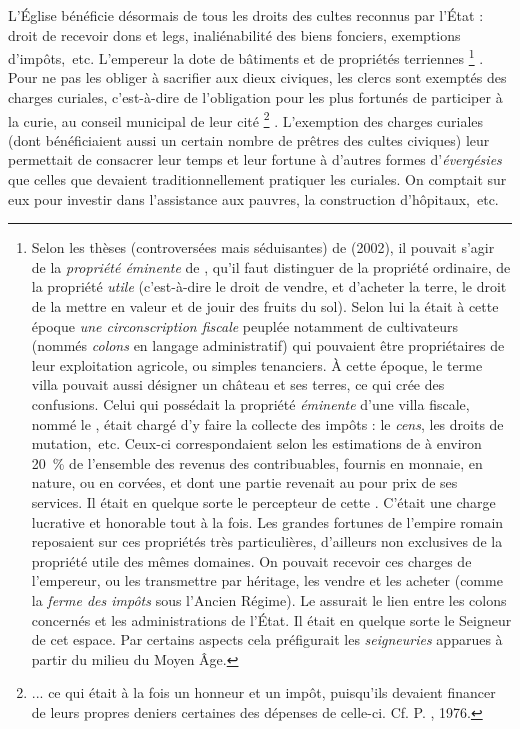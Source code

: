  L'Église bénéficie désormais de tous les droits des cultes reconnus par l'État : droit de recevoir dons et legs, inaliénabilité des biens fonciers, exemptions d'impôts,~etc. L'empereur la dote de bâtiments et de propriétés terriennes%
\footnote{Selon les thèses (controversées mais séduisantes) de  (2002), il pouvait s'agir de la \emph{propriété éminente} de , qu'il faut distinguer de la propriété ordinaire, de la propriété \emph{utile} (c'est-à-dire le droit de vendre, et d'acheter la terre, le droit de la mettre en valeur et de jouir des fruits du sol). Selon lui la  était à cette époque \emph{une circonscription fiscale} peuplée notamment de cultivateurs (nommés \emph{colons} en langage administratif) qui pouvaient être propriétaires de leur exploitation agricole, ou simples tenanciers. À cette époque, le terme villa pouvait aussi désigner un château et ses terres, ce qui crée des confusions. Celui qui possédait la propriété \emph{éminente} d'une villa fiscale, nommé le , était chargé d'y faire la collecte des impôts : le \emph{cens}, les droits de mutation,~etc. Ceux-ci correspondaient selon les estimations de  à environ 20~\% de l'ensemble des revenus des contribuables, fournis en monnaie, en nature, ou en corvées, et dont une partie revenait au  pour prix de ses services. Il était en quelque sorte le percepteur de cette . C'était une charge lucrative et honorable tout à la fois. Les grandes fortunes de l'empire romain reposaient sur ces propriétés très particulières, d'ailleurs non exclusives de la propriété utile des mêmes domaines. On pouvait recevoir ces charges de l'empereur, ou les transmettre par héritage, les vendre et les acheter (comme la \emph{ferme des impôts} sous l'Ancien Régime). Le  assurait le lien entre les colons concernés et les administrations de l'État. Il était en quelque sorte le Seigneur de cet espace. Par certains aspects cela préfigurait les \emph{seigneuries} apparues à partir du milieu du Moyen Âge.}%
. Pour ne pas les obliger à sacrifier aux dieux civiques, les clercs sont exemptés des charges curiales, c'est-à-dire de l'obligation pour les plus fortunés de participer à la curie, au conseil municipal de leur cité%
\footnote{... ce qui était à la fois un honneur et un impôt, puisqu'ils devaient financer de leurs propres deniers certaines des dépenses de celle-ci. Cf. P. , 1976.} 
. L'exemption des charges curiales (dont bénéficiaient aussi un certain nombre de prêtres des cultes civiques) leur permettait de consacrer leur temps et leur fortune à d'autres formes d'\emph{évergésies} que celles que devaient traditionnellement pratiquer les curiales. On comptait sur eux pour investir dans l'assistance aux pauvres, la construction d'hôpitaux,~etc. 

